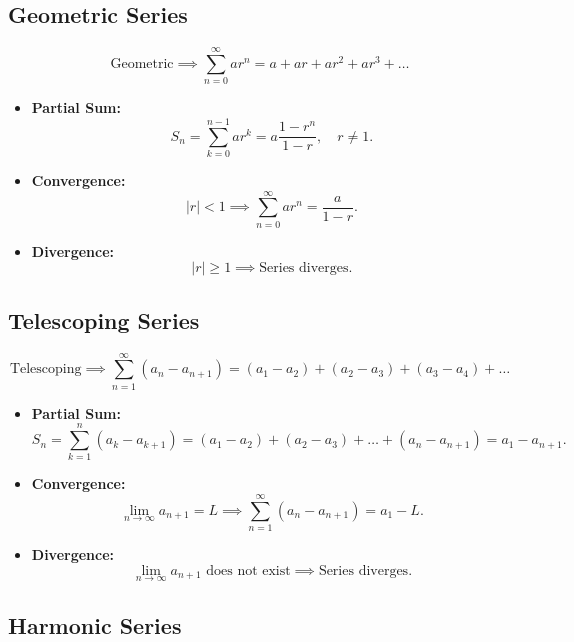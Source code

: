 \documentclass[a4paper,11pt]{article}
\begin{document}


\subsection{Geometric Series}

\begin{tcolorbox}
    \[
    \text{Geometric} \implies \sum_{n=0}^{\infty} ar^n = a + ar + ar^2 + ar^3 + \dots
    \]
    \begin{itemize}
        \item \textbf{Partial Sum:}
        \[ S_n = \sum_{k=0}^{n-1} ar^k = a \frac{1-r^n}{1-r}, \quad r\neq1. \]
        \item \textbf{Convergence:}
        \[ |r| < 1 \implies \sum_{n=0}^{\infty} ar^n = \frac{a}{1-r}. \]
        \item \textbf{Divergence:}
        \[ |r| \geq 1 \implies \text{Series diverges.} \]
    \end{itemize}
\end{tcolorbox}




\subsection{Telescoping Series}

\begin{tcolorbox}
    \[
    \text{Telescoping} \implies \sum_{n=1}^{\infty} (a_n - a_{n+1}) = (a_1 - a_2) + (a_2 - a_3) + (a_3 - a_4) + \dots
    \]
    \begin{itemize}
        \item \textbf{Partial Sum:}
        \[ S_n = \sum_{k=1}^{n} (a_k - a_{k+1}) = (a_1 - a_2) + (a_2 - a_3) + \dots + (a_n - a_{n+1}) = a_1 - a_{n+1}. \]
        \item \textbf{Convergence:}
        \[ \lim_{n \to \infty} a_{n+1} = L \implies \sum_{n=1}^{\infty} (a_n - a_{n+1}) = a_1-L. \]
        \item \textbf{Divergence:}
        \[ \lim_{n \to \infty} a_{n+1} \text{ does not exist} \implies \text{Series diverges.} \]
    \end{itemize}
\end{tcolorbox}




\subsection{Harmonic Series}
\end{document}

